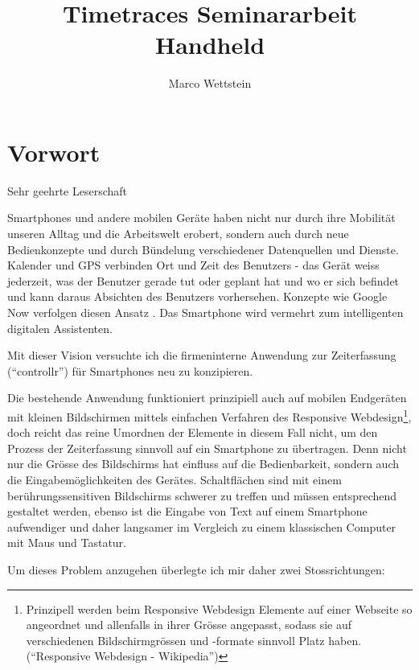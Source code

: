 \documentclass[]{article}
\title{Timetraces Seminararbeit Handheld}
\author{Marco Wettstein}
\date{}
\begin{document}
\maketitle

{
\hypersetup{linkcolor=black}
\setcounter{tocdepth}{3}
\tableofcontents
}
\listoffigures

\lstlistoflistings

\newpage

\section{Vorwort}\label{vorwort}

Sehr geehrte Leserschaft

Smartphones und andere mobilen Geräte haben nicht nur durch ihre
Mobilität unseren Alltag und die Arbeitswelt erobert, sondern auch durch
neue Bedienkonzepte und durch Bündelung verschiedener Datenquellen und
Dienste. Kalender und GPS verbinden Ort und Zeit des Benutzers - das
Gerät weiss jederzeit, was der Benutzer gerade tut oder geplant hat und
wo er sich befindet und kann daraus Absichten des Benutzers vorhersehen.
Konzepte wie Google Now verfolgen diesen Ansatz \cite{googleNow}. Das
Smartphone wird vermehrt zum intelligenten digitalen Assistenten.

Mit dieser Vision versuchte ich die firmeninterne Anwendung zur
Zeiterfassung (``controllr'') für Smartphones neu zu konzipieren.

Die bestehende Anwendung funktioniert prinzipiell auch auf mobilen
Endgeräten mit kleinen Bildschirmen mittels einfachen Verfahren des
Responsive Webdesign\footnote{Prinzipell werden beim Responsive
  Webdesign Elemente auf einer Webseite so angeordnet und allenfalls in
  ihrer Grösse angepasst, sodass sie auf verschiedenen Bildschirmgrössen
  und -formate sinnvoll Platz haben. (``Responsive Webdesign -
  Wikipedia'')}, doch reicht das reine Umordnen der Elemente in diesem
Fall nicht, um den Prozess der Zeiterfassung sinnvoll auf ein Smartphone
zu übertragen. Denn nicht nur die Grösse des Bildschirms hat einfluss
auf die Bedienbarkeit, sondern auch die Eingabemöglichkeiten des
Gerätes. Schaltflächen sind mit einem berührungssensitiven Bildschirms
schwerer zu treffen und müssen entsprechend gestaltet werden, ebenso ist
die Eingabe von Text auf einem Smartphone aufwendiger und daher
langsamer im Vergleich zu einem klassischen Computer mit Maus und
Tastatur.

Um dieses Problem anzugehen überlegte ich mir daher zwei
Stossrichtungen:
\end{document}
